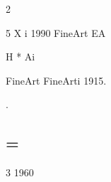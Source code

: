 \documentclass{article}
\begin{document}
\sloppy

\begin{paracol}{2}
\RaggedRight

5
X
i
1990
FineArt
EA


H
*
Ai


FineArt
FineArti
1915.

\switchcolumn
\RaggedRight

.


\subsection*{=}


3
1960




\end{paracol}
\end{document}
